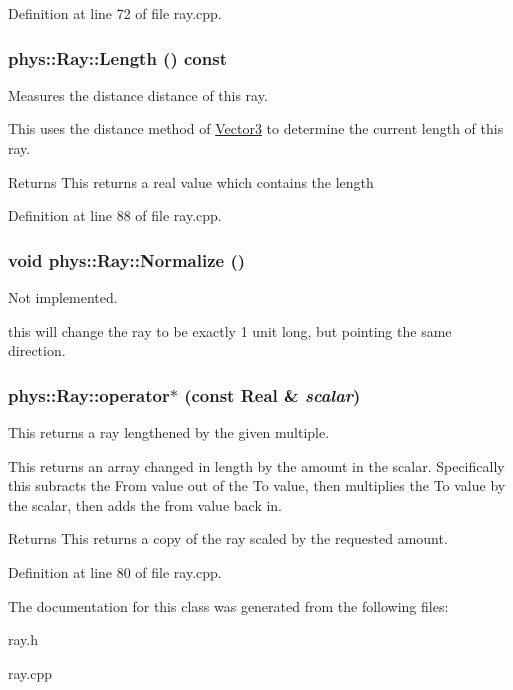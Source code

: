 Definition at line 72 of file ray.cpp.

\hypertarget{classphys_1_1Ray_add544025fcd6d1cdcfed3c0413b3701b}{
\subsubsection[{Length}]{ phys::Ray::Length () const}}
\label{df/d57/classphys_1_1Ray_add544025fcd6d1cdcfed3c0413b3701b}


Measures the distance distance of this ray. 

This uses the distance method of \hyperlink{classphys_1_1Vector3}{Vector3} to determine the current length of this ray. \begin{DoxyReturn}{Returns}
This returns a real value which contains the length 
\end{DoxyReturn}


Definition at line 88 of file ray.cpp.

\hypertarget{classphys_1_1Ray_a2acbaef60718001a048db26ccaaef787}{
\subsubsection[{Normalize}]{\setlength{\rightskip}{0pt plus 5cm}void phys::Ray::Normalize ()}}
\label{df/d57/classphys_1_1Ray_a2acbaef60718001a048db26ccaaef787}


Not implemented. 

this will change the ray to be exactly 1 unit long, but pointing the same direction. \hypertarget{classphys_1_1Ray_a9f26694f254725135f56f694b2e5df06}{
\subsubsection[{operator$\ast$}]{ phys::Ray::operator$\ast$ (const {\bf Real} \& {\em scalar})}}
\label{df/d57/classphys_1_1Ray_a9f26694f254725135f56f694b2e5df06}


This returns a ray lengthened by the given multiple. 

This returns an array changed in length by the amount in the scalar. Specifically this subracts the From value out of the To value, then multiplies the To value by the scalar, then adds the from value back in. \begin{DoxyReturn}{Returns}
This returns a copy of the ray scaled by the requested amount. 
\end{DoxyReturn}


Definition at line 80 of file ray.cpp.



The documentation for this class was generated from the following files:\begin{DoxyCompactItemize}
\item 
ray.h\item 
ray.cpp\end{DoxyCompactItemize}
